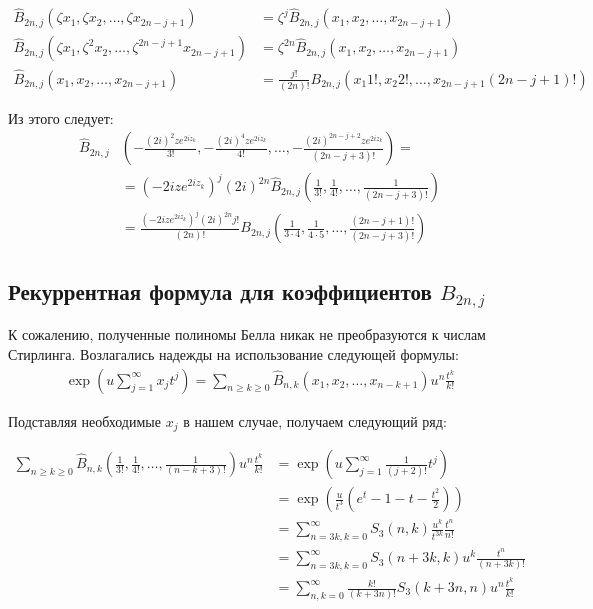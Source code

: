 \documentclass[a4paper, 12pt]{article}
\begin{document}
\begin{equation}
\begin{aligned}
    \hat{B}_{2n, j}(\zeta x_1, \zeta x_2, \dots, \zeta x_{2n-j+1}) &= \zeta^j \hat{B}_{2n, j}( x_1,  x_2, \dots,  x_{2n-j+1})\\
    \hat{B}_{2n, j}(\zeta x_1, \zeta^2 x_2, \dots, \zeta^{2n-j+1} x_{2n-j+1}) &= \zeta^{2n} \hat{B}_{2n, j}( x_1,  x_2, \dots,  x_{2n-j+1})\\
    \hat{B}_{2n, j}( x_1,  x_2, \dots,  x_{2n-j+1}) &= \frac{j!}{(2n)!}B_{2n, j}\left(x_1 1!, x_2 2!, \dots, x_{2n-j+1}(2n-j+1)!\right)
\end{aligned}
\end{equation}

Из этого следует:
\begin{equation}
\begin{aligned}
    \hat{B}_{2n, j}&\left(-\frac{(2i)^{2}ze^{2iz_k}}{3!}, -\frac{(2i)^{4}ze^{2iz_k}}{4!}, \dots, -\frac{(2i)^{2n-j+2}ze^{2iz_k}}{(2n-j+3)!}\right) = \\
    &= (-2iz e^{2iz_k})^j (2i)^{2n}\hat{B}_{2n, j}\left(\frac{1}{3!}, \frac{1}{4!}, \dots, \frac{1}{(2n-j+3)!}\right)\\
    &= \frac{(-2iz e^{2iz_k})^j (2i)^{2n}j!}{(2n)!}B_{2n, j}\left( \frac{1}{3\cdot 4}, \frac{1}{4\cdot 5} , \dots, \frac{(2n-j+1)!}{(2n-j+3)!}\right)
\end{aligned}
\end{equation}
\subsection*{Рекуррентная формула для коэффициентов $B_{2n, j}$}
К сожалению, полученные полиномы Белла никак не преобразуются к числам Стирлинга. Возлагались надежды на использование следующей формулы:
\begin{equation}
\begin{aligned}
    \exp\left(u \sum\limits_{j=1}^{\infty}x_j t^j\right) = \sum\limits_{n\geq k\geq 0} 
    \hat{B}_{n,k}\left(x_1, x_2, \dots, x_{n-k+1}\right) u^n \frac{t^k}{k!}
\end{aligned}
\end{equation}

Подставляя необходимые $x_j$ в нашем случае, получаем следующий ряд:

\begin{equation}
\begin{aligned}
    \sum\limits_{n\geq k\geq 0} 
    \hat{B}_{n, k}\left(\frac{1}{3!}, \frac{1}{4!}, \dots, \frac{1}{(n-k+3)!}\right) u^n \frac{t^k}{k!} &= 
    \exp\left(u \sum\limits_{j=1}^{\infty}\frac{1}{(j+2)!} t^j\right) \\ 
    &= \exp\left(\frac{u}{t^3}\left(e^t - 1 -t - \frac{t^2}{2}\right)\right) \\
    &= \sum\limits_{n=3k, k = 0}^{\infty} S_{3}(n, k) \frac{u^k}{t^{3k}}\frac{t^n}{n!} \\
    &= \sum\limits_{n=3k, k = 0}^{\infty} S_{3}(n+3k, k) u^k\frac{t^n}{(n+3k)!} \\
    &= \sum\limits_{n, k = 0}^{\infty} \frac{k!}{(k+3n)!}S_{3}(k+3n, n) u^n\frac{t^k}{k!}
\end{aligned}
\end{equation}
\end{document}
